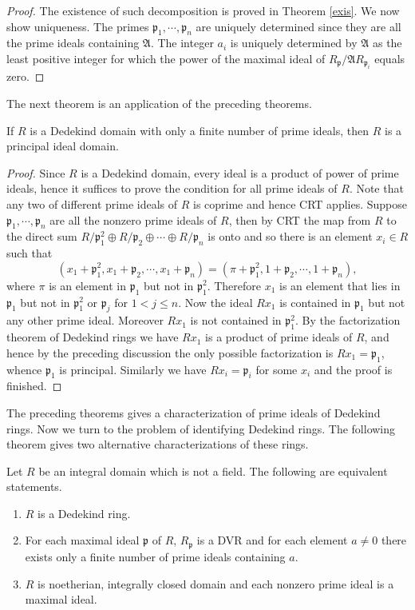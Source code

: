 \begin{proof}
The existence of such decomposition is proved in Theorem \ref{exis}. We now show uniqueness. The primes $\mathfrak{p}_1,\cdots,\mathfrak{p}_n$ are uniquely determined since they are all the prime ideals containing $\mathfrak{A}$. The integer $a_i$ is uniquely determined by $\mathfrak{A}$ as the least positive integer for which the power of the maximal ideal of $R_\mathfrak{p}/\mathfrak{A}R_{\mathfrak{p}_i}$ equals zero.
\end{proof}
The next theorem is an application of the preceding theorems.
\begin{theorem}
If $R$ is a Dedekind domain with only a finite number of prime ideals, then $R$ is a principal ideal domain.
\end{theorem}
\begin{proof}
Since $R$ is a Dedekind domain, every ideal is a product of power of prime ideals, hence it suffices to prove the condition for all prime ideals of $R$. Note that any two of different prime ideals of $R$ is coprime and hence CRT applies. Suppose $\mathfrak{p}_1,\cdots,\mathfrak{p}_n$ are all the nonzero prime ideals of $R$, then by CRT the map from $R$ to the direct sum $R/\mathfrak{p}_1^2\oplus R/\mathfrak{p}_2\oplus\cdots\oplus R/\mathfrak{p}_n$ is onto and so there is an element $x_i\in R$ such that 
$$
\left( x_1+\mathfrak{p} _{1}^{2},x_1+\mathfrak{p} _2,\cdots ,x_1+\mathfrak{p} _n \right) =\left( \pi +\mathfrak{p} _{1}^{2},1+\mathfrak{p} _2,\cdots ,1+\mathfrak{p} _n \right) ,
$$
where $\pi$ is an element in $\mathfrak{p}_1$ but not in $\mathfrak{p}_1^2$. Therefore $x_1$ is an element that lies in $\mathfrak{p}_1$ but not in $\mathfrak{p}_1^2$ or $\mathfrak{p}_j$ for $1<j\le n$. Now the ideal $Rx_1$ is contained in $\mathfrak{p}_1$ but not any other prime ideal. Moreover $Rx_1$ is not contained in $\mathfrak{p}_1^2$. By the factorization theorem of Dedekind rings we have $Rx_1$ is a product of prime ideals of $R$, and hence by the preceding discussion the only possible factorization is $Rx_1=\mathfrak{p}_1$, whence $\mathfrak{p}_1$ is principal. Similarly we have $Rx_i=\mathfrak{p}_i$ for some $x_i$ and the proof is finished.
\end{proof}
The preceding theorems gives a characterization of prime ideals of Dedekind rings. Now we turn to the problem of identifying Dedekind rings. The following theorem gives two alternative characterizations of these rings.
\begin{theorem}\label{DedeChara}
Let $R$ be an integral domain which is not a field. The following are equivalent statements.
\begin{enumerate}
    \item $R$ is a Dedekind ring.
    \item For each maximal ideal $\mathfrak{p}$ of $R$, $R_\mathfrak{p}$ is a DVR and for each element $a\ne 0$ there exists only a finite number of prime ideals containing $a$.
    \item $R$ is noetherian, integrally closed domain and each nonzero prime ideal is a maximal ideal.
\end{enumerate}
\end{theorem}
